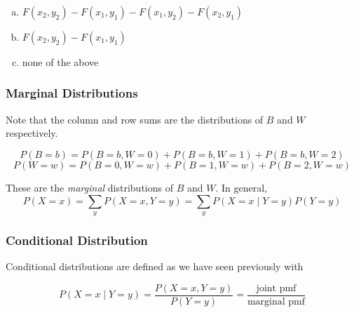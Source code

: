 \documentclass[slidestop,compress,mathserif]{beamer}
\begin{document}
\begin{frame}\frametitle{}



\begin{enumerate}[(a)]
\item $F(x_2, y_2) - F(x_1, y_1) - F(x_1, y_2) - F(x_2, y_1)$
\item $F(x_2, y_2) - F(x_1, y_1)$
\item none of the above
\end{enumerate}



\end{frame}


\begin{frame}
\frametitle{Marginal Distributions}

Note that the column and row sums are the distributions of $B$ and $W$ respectively.

{\footnotesize
\[P(B=b) = P(B=b,W=0)+P(B=b,W=1)+P(B=b,W=2)\]
\[P(W=w) = P(B=0,W=w)+P(B=1,W=w)+P(B=2,W=w)\]
}

These are the \emph{marginal} distributions of $B$ and $W$. In general,
\[ P(X=x) = \sum_y P(X=x,Y=y) = \sum_y P(X=x \mid Y=y)P(Y=y)\]

\end{frame}




\begin{frame}
\frametitle{Conditional Distribution}

Conditional distributions are defined as we have seen previously with

\[ P(X=x \mid Y=y) = \frac{P(X=x,Y=y)}{P(Y=y)} = \frac{\text{joint pmf}}{\text{marginal pmf}} \]

\end{frame}
\end{document}
